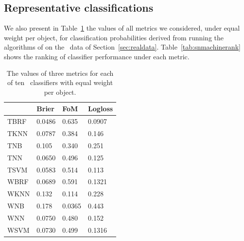 \subsection{Representative classifications}
\label{sec:realresults}

We also present in Table~\ref{tab:snmachinevals} the values of all metrics we considered, under equal weight per object, for classification probabilities derived from running the algorithms of \citet{lochner_photometric_2016} on the \snphotcc\ data of Section~\ref{sec:realdata}.
Table~\ref{tab:snmachinerank} shows the ranking of classifier performance under each metric.

\begin{table}[]
\begin{tabular}{llll}
& Brier   & FoM   & Logloss            \\
\hline
TBRF  		& 0.0486  & 0.635   & 0.0907  \\
TKNN      & 0.0787  & 0.384   & 0.146  \\
TNB       & 0.105   & 0.340   & 0.251 \\
TNN				& 0.0650  & 0.496   & 0.125 \\
TSVM      & 0.0583  & 0.514   & 0.113 \\
WBRF   		& 0.0689  & 0.591   & 0.1321 \\
WKNN      & 0.132   & 0.114   & 0.228 \\
WNB       & 0.178   & 0.0365  & 0.443  \\
WNN 			& 0.0750  & 0.480   & 0.152 \\
WSVM      & 0.0730  & 0.499   & 0.1316 \\
\end{tabular}
\caption{The values of three metrics for each of ten \snmachine\ classifiers with equal weight per object.}
	\label{tab:snmachinevals}
\end{table}

